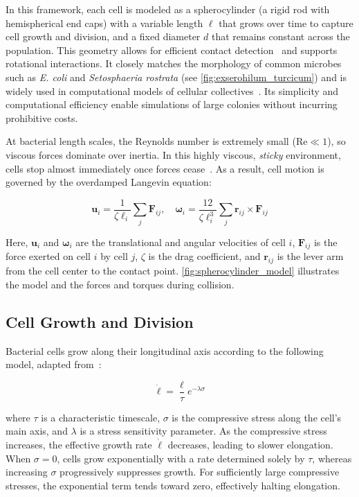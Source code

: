 \documentclass[conference]{IEEEtran}
\begin{document}
In this framework, each cell is modeled as a spherocylinder (a rigid rod with hemispherical end caps) with a variable length $\ell$ that grows over time to capture cell growth and division, and a fixed diameter $d$ that remains constant across the population. This geometry allows for efficient contact detection~\cite{GeometricTools} and supports rotational interactions. It closely matches the morphology of common microbes such as \textit{E. coli} and \textit{Setosphaeria rostrata} (see \autoref{fig:exserohilum_turcicum}) and is widely used in computational models of cellular collectives~\cite{You2018, Weady2024, Blanchard2015, Warren2019, Ghosh2015}. Its simplicity and computational efficiency enable simulations of large colonies without incurring prohibitive costs.

At bacterial length scales, the Reynolds number is extremely small ($\text{Re} \ll 1$), so viscous forces dominate over inertia. In this highly viscous, \textit{sticky} environment, cells stop almost immediately once forces cease~\cite{datta2024lifelowreynoldsnumber,Rudge2012}. As a result, cell motion is governed by the overdamped Langevin equation:

\begin{equation} \label{eq:overdamped_langevin}
    \mathbf{u}_i = \frac{1}{\zeta \ell_i} \sum_j \mathbf{F}_{ij}, \quad
    \boldsymbol{\omega}_i = \frac{12}{\zeta \ell_i^3} \sum_j \mathbf{r}_{ij} \times \mathbf{F}_{ij}
\end{equation}

Here, $\mathbf{u}_i$ and $\boldsymbol{\omega}_i$ are the translational and angular velocities of cell $i$, $\mathbf{F}_{ij}$ is the force exerted on cell $i$ by cell $j$, $\zeta$ is the drag coefficient, and $\mathbf{r}_{ij}$ is the lever arm from the cell center to the contact point. \autoref{fig:spherocylinder_model} illustrates the model and the forces and torques during collision.
\subsection{Cell Growth and Division}

Bacterial cells grow along their longitudinal axis according to the following model, adapted from~\cite{Weady2024SM}:

\begin{equation} \label{eq:growth}
    \dot{\ell} = \frac{\ell}{\tau} e^{-\lambda \sigma}
\end{equation}

where $\tau$ is a characteristic timescale, $\sigma$ is the compressive stress along the cell's main axis, and $\lambda$ is a stress sensitivity parameter. As the compressive stress increases, the effective growth rate $\dot{\ell}$ decreases, leading to slower elongation. When $\sigma = 0$, cells grow exponentially with a rate determined solely by $\tau$, whereas increasing $\sigma$ progressively suppresses growth. For sufficiently large compressive stresses, the exponential term tends toward zero, effectively halting elongation.
\end{document}
